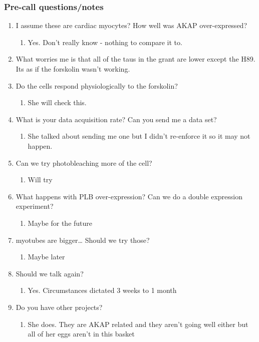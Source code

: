 \documentclass[11pt]{article}
\begin{document}
\subsubsection{Pre-call questions/notes}
\label{sec:orgdefd450}
\begin{enumerate}
\item I assume these are cardiac myocytes?  How well was AKAP over-expressed?
\label{sec:orga18e98b}
\begin{enumerate}
\item Yes.  Don't really know - nothing to compare it to.
\label{sec:org05931ae}
\end{enumerate}
\item What worries me is that all of the taus in the grant are lower except the H89.  Its as if the forskolin wasn't working.
\label{sec:org44d7704}
\item Do the cells respond physiologically to the forskolin?
\label{sec:org5321af8}
\begin{enumerate}
\item She will check this.
\label{sec:orge6d7a7a}
\end{enumerate}
\item What is your data acquisition rate? Can you send me a data set?
\label{sec:org9bd29af}
\begin{enumerate}
\item She talked about sending me one but I didn't re-enforce it so it may not happen.
\label{sec:orgccd2a85}
\end{enumerate}
\item Can we try photobleaching more of the cell?
\label{sec:org6d0c0f4}
\begin{enumerate}
\item Will try
\label{sec:org40cde91}
\end{enumerate}
\item What happens with PLB over-expression?  Can we do a double expression experiment?
\label{sec:org0c1d3b0}
\begin{enumerate}
\item Maybe for the future
\label{sec:orgb5874f8}
\end{enumerate}
\item myotubes are bigger\ldots{}  Should we try those?
\label{sec:org690a32c}
\begin{enumerate}
\item Maybe later
\label{sec:orge4a4449}
\end{enumerate}
\item Should we talk again?
\label{sec:orge58410a}
\begin{enumerate}
\item Yes.  Circumstances dictated 3 weeks to 1 month
\label{sec:orgdb159d7}
\end{enumerate}
\item Do you have other projects?
\label{sec:org52f5015}
\begin{enumerate}
\item She does.  They are AKAP related and they aren't going well either but all of her eggs aren't in this basket
\label{sec:orgaf44af1}
\end{enumerate}
\end{enumerate}
\end{document}
